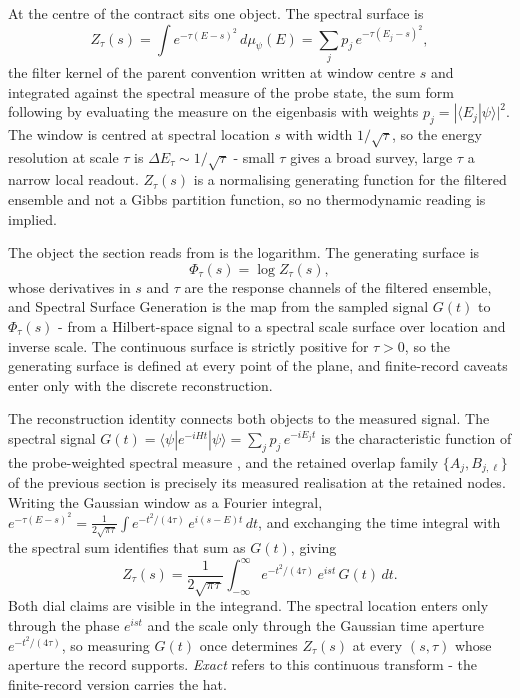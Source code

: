 At the centre of the contract sits one object. The spectral surface is
\begin{equation}\label{def:spectral-surface}
Z_\tau(s)=\int e^{-\tau(E-s)^{2}}\,d\mu_\psi(E)=\sum_j p_j\,e^{-\tau(E_j-s)^{2}},
\end{equation}
the filter kernel of the parent convention written at window centre $s$ and integrated against the spectral measure of the probe state, the sum form following by evaluating the measure on the eigenbasis with weights $p_j=|\langle E_j|\psi\rangle|^{2}$. The window is centred at spectral location $s$ with width $1/\sqrt{\tau}$, so the energy resolution at scale $\tau$ is $\Delta E_\tau\sim 1/\sqrt{\tau}$ - small $\tau$ gives a broad survey, large $\tau$ a narrow local readout. $Z_\tau(s)$ is a normalising generating function for the filtered ensemble and not a Gibbs partition function, so no thermodynamic reading is implied.

The object the section reads from is the logarithm. The generating surface is
\begin{equation}\label{def:generating-surface}
\Phi_\tau(s)=\log Z_\tau(s),
\end{equation}
whose derivatives in $s$ and $\tau$ are the response channels of the filtered ensemble, and Spectral Surface Generation is the map from the sampled signal $G(t)$ to $\Phi_\tau(s)$ - from a Hilbert-space signal to a spectral scale surface over location and inverse scale. The continuous surface is strictly positive for $\tau>0$, so the generating surface is defined at every point of the plane, and finite-record caveats enter only with the discrete reconstruction.

The reconstruction identity connects both objects to the measured signal. The spectral signal $G(t)=\langle\psi|e^{-iHt}|\psi\rangle=\sum_j p_j\,e^{-iE_j t}$ is the characteristic function of the probe-weighted spectral measure \cite{mccaul2025snacks}, and the retained overlap family $\{A_j, B_{j,\ell}\}$ of the previous section is precisely its measured realisation at the retained nodes. Writing the Gaussian window as a Fourier integral, $e^{-\tau(E-s)^{2}}=\tfrac{1}{2\sqrt{\pi\tau}}\int e^{-t^{2}/(4\tau)}\,e^{i(s-E)t}\,dt$, and exchanging the time integral with the spectral sum identifies that sum as $G(t)$, giving
\begin{equation}\label{thm:fourier-reconstruction-identity}
Z_\tau(s)=\frac{1}{2\sqrt{\pi\tau}}\int_{-\infty}^{\infty}e^{-t^{2}/(4\tau)}\,e^{ist}\,G(t)\,dt.
\end{equation}
Both dial claims are visible in the integrand. The spectral location enters only through the phase $e^{ist}$ and the scale only through the Gaussian time aperture $e^{-t^{2}/(4\tau)}$, so measuring $G(t)$ once determines $Z_\tau(s)$ at every $(s,\tau)$ whose aperture the record supports. \emph{Exact} refers to this continuous transform - the finite-record version carries the hat.

